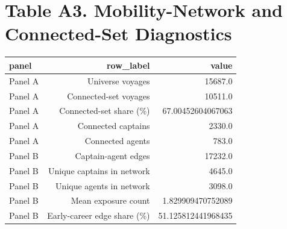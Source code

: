 \documentclass{article}
\begin{document}
\section*{Table A3. Mobility-Network and Connected-Set Diagnostics}
\begin{tabular}{lrr}
\hline
panel & row_label & value \\
\hline
Panel A & Universe voyages & 15687.0 \\
Panel A & Connected-set voyages & 10511.0 \\
Panel A & Connected-set share (\%) & 67.00452604067063 \\
Panel A & Connected captains & 2330.0 \\
Panel A & Connected agents & 783.0 \\
Panel B & Captain-agent edges & 17232.0 \\
Panel B & Unique captains in network & 4645.0 \\
Panel B & Unique agents in network & 3098.0 \\
Panel B & Mean exposure count & 1.829909470752089 \\
Panel B & Early-career edge share (\%) & 51.125812441968435 \\
\hline
\end{tabular}
\end{document}
